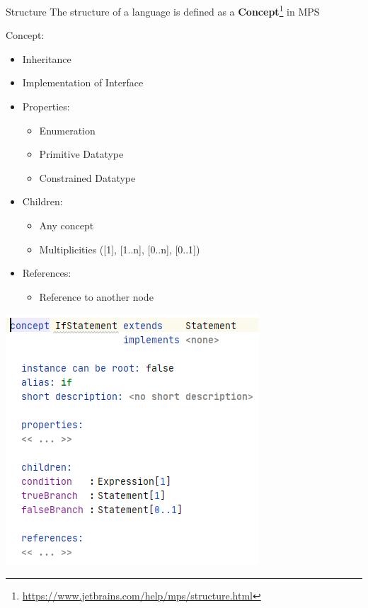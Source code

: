 	\begin{frame}{Structure}
		The structure of a language is defined as a \textbf{Concept}\footnote{\url{https://www.jetbrains.com/help/mps/structure.html}} in MPS\\
		\begin{minipage}{0.45\textwidth}
			Concept:
			\begin{itemize}
				\item Inheritance
				\item Implementation of Interface
				\item Properties:
				\begin{itemize}
					\item Enumeration
					\item Primitive Datatype
					\item Constrained Datatype
				\end{itemize}
				\item Children:
				\begin{itemize}
					\item Any concept 
					\item Multiplicities ([1], [1..n], [0..n], [0..1])
				\end{itemize}
				\item References:
				\begin{itemize}
					\item Reference to another node
				\end{itemize}
			\end{itemize}
		\end{minipage}
		\begin{minipage}{0.45\textwidth}
			\includegraphics[height=0.8\textheight]{illustrations/concept.png}
		\end{minipage}
	\end{frame}


